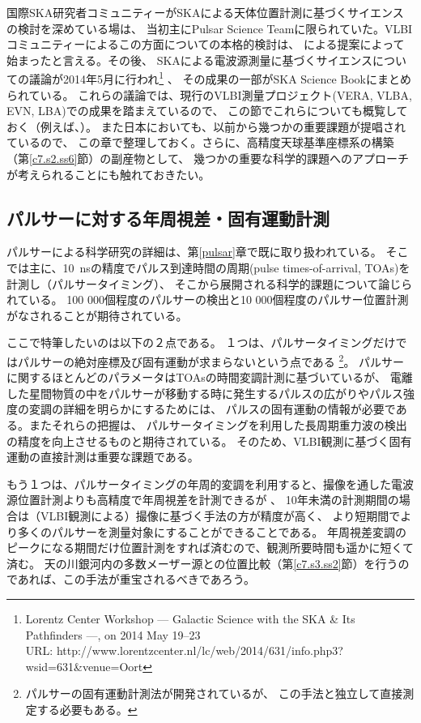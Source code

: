国際SKA研究者コミュニティーがSKAによる天体位置計測に基づくサイエンスの検討を深めている場は、
当初主にPulsar Science Teamに限られていた。VLBIコミュニティーによるこの方面についての本格的検討は、
\citet{SKA135}による提案によって始まったと言える。その後、
SKAによる電波源測量に基づくサイエンスについての議論が2014年5月に行われ\footnote
{Lorentz Center Workshop --- Galactic Science with the SKA \& Its Pathfinders ---, on 2014 May 19--23\\
URL: http://www.lorentzcenter.nl/lc/web/2014/631/info.php3?wsid=631\&venue=Oort} 、
その成果の一部がSKA Science Bookにまとめられている\citep{Green...2014}。
これらの議論では、現行のVLBI測量プロジェクト(VERA, VLBA, EVN, LBA)での成果を踏まえているので、
この節でこれらについても概覧しておく（例えば、\citealt{2014ARA&A..52..339R}）。
また日本においても、\citet{SKA135}以前から幾つかの重要課題が提唱されているので、
この章で整理しておく。さらに、高精度天球基準座標系の構築（第\ref{c7.s2.ss6}節）の副産物として、
幾つかの重要な科学的課題へのアプローチが考えられることにも触れておきたい。

\setcounter{subsection}{0}\subsection{パルサーに対する年周視差・固有運動計測}\label{c7.s3.ss1}

パルサーによる科学研究の詳細は、第\ref{pulsar}章で既に取り扱われている。
そこでは主に、10~nsの精度でパルス到達時間の周期(pulse times-of-arrival, TOAs)を計測し（パルサータイミング）、
そこから展開される科学的課題について論じられている。
100 000個程度のパルサーの検出と10 000個程度のパルサー位置計測がなされることが期待されている。

ここで特筆したいのは以下の２点である。
１つは、パルサータイミングだけではパルサーの絶対座標及び固有運動が求まらないという点である
\footnote{パルサーの固有運動計測法が開発されている\citep{2003ASPC..302..215H}が、
この手法と独立して直接測定する必要もある。}。
パルサーに関するほとんどのパラメータはTOAsの時間変調計測に基づいているが、
電離した星間物質の中をパルサーが移動する時に発生するパルスの広がりやパルス強度の変調の詳細を明らかにするためには、
パルスの固有運動の情報が必要である。またそれらの把握は、
パルサータイミングを利用した長周期重力波の検出の精度を向上させるものと期待されている。
そのため、VLBI観測に基づく固有運動の直接計測は重要な課題である。

もう１つは、パルサータイミングの年周的変調を利用すると、撮像を通した電波源位置計測よりも高精度で年周視差を計測できるが
\citep{2011A&A...528A.108S}、
10年未満の計測期間の場合は（VLBI観測による）撮像に基づく手法の方が精度が高く、
より短期間でより多くのパルサーを測量対象にすることができることである。
年周視差変調のピークになる期間だけ位置計測をすれば済むので、観測所要時間も遥かに短くて済む。
天の川銀河内の多数メーザー源との位置比較（第\ref{c7.s3.ss2}節）を行うのであれば、この手法が重宝されるべきであろう。

